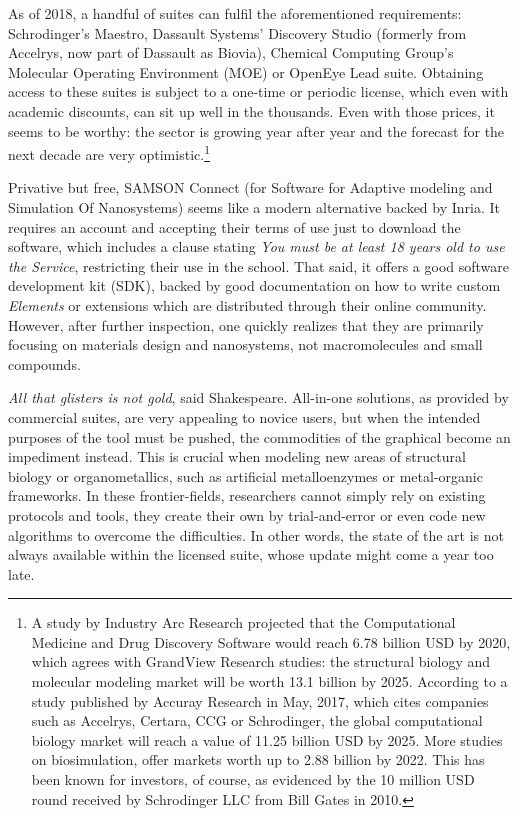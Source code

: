 As of 2018, a handful of suites can fulfil the aforementioned requirements: Schrodinger's Maestro,\cite{maestro} Dassault Systems’ Discovery Studio (formerly from Accelrys, now part of Dassault as Biovia),\cite{biovia2017discovery} Chemical Computing Group's Molecular Operating Environment (MOE)\cite{chemical2016molecular} or OpenEye Lead suite.\cite{openeyelead} Obtaining access to these suites is subject to a one-time or periodic license, which even with academic discounts, can sit up well in the thousands. Even with those prices, it seems to be worthy: the sector is growing year after year and the forecast for the next decade are very optimistic.\footnote{A study by Industry Arc Research projected that the Computational Medicine and Drug Discovery Software would reach 6.78 billion USD by 2020,\cite{industryarc} which agrees with GrandView Research studies: the structural biology and molecular modeling market will be worth 13.1 billion by 2025.\cite{grandviewresearch} According to a study published by Accuray Research in May, 2017,\cite{Accuray} which cites companies such as Accelrys, Certara, CCG or Schrodinger, the global computational biology market will reach a value of 11.25 billion USD by 2025. More studies on biosimulation, offer markets worth up to 2.88 billion by 2022.\cite{marketsandmarkets} This has been known for investors, of course, as evidenced by the 10 million USD round received by Schrodinger LLC from Bill Gates in 2010.}

Privative but free, SAMSON Connect (for Software for Adaptive modeling and Simulation Of Nanosystems) seems like a modern alternative backed by Inria. It requires an account and accepting their terms of use just to download the software, which includes a clause stating \textit{You must be at least 18 years old to use the Service}, restricting their use in the school. That said, it offers a good software development kit (SDK), backed by good documentation on how to write custom \textit{Elements}  or extensions which are distributed through their online community. However, after further inspection, one quickly realizes that they are primarily focusing on materials design and nanosystems, not macromolecules and small compounds.


\textit{All that glisters is not gold}, said Shakespeare. All-in-one solutions, as provided by commercial suites, are very appealing to novice users, but when the intended purposes of the tool must be pushed, the commodities of the graphical become an impediment instead. This is crucial when modeling new areas of structural biology or organometallics, such as artificial metalloenzymes or metal-organic frameworks. In these frontier-fields, researchers cannot simply rely on existing protocols and tools, they create their own by trial-and-error or even code new algorithms to overcome the difficulties. In other words, the state of the art is not always available within the licensed suite, whose update might come a year too late.

